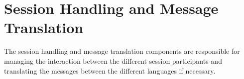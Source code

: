 \chapter{Session Handling and Message Translation}

\label{SessionHandlingAndMessageTranslation}

The session handling and message translation components are responsible for managing the interaction between the 
different session participants and translating the messages between the different languages if necessary.

